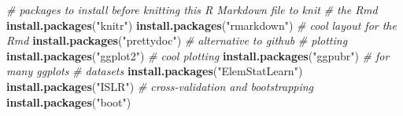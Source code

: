 \documentclass[]{article}
\newenvironment{Shaded}{\begin{snugshade}}{\end{snugshade}}
\newcommand{\KeywordTok}[1]{\textcolor[rgb]{0.13,0.29,0.53}{\textbf{#1}}}
\newcommand{\StringTok}[1]{\textcolor[rgb]{0.31,0.60,0.02}{#1}}
\newcommand{\CommentTok}[1]{\textcolor[rgb]{0.56,0.35,0.01}{\textit{#1}}}
\newcommand{\NormalTok}[1]{#1}
\begin{document}
\begin{Shaded}
\begin{Highlighting}[]
\CommentTok{# packages to install before knitting this R Markdown file to knit}
\CommentTok{# the Rmd}
\KeywordTok{install.packages}\NormalTok{(}\StringTok{"knitr"}\NormalTok{)}
\KeywordTok{install.packages}\NormalTok{(}\StringTok{"rmarkdown"}\NormalTok{)}
\CommentTok{# cool layout for the Rmd}
\KeywordTok{install.packages}\NormalTok{(}\StringTok{"prettydoc"}\NormalTok{)  }\CommentTok{# alternative to github}
\CommentTok{# plotting}
\KeywordTok{install.packages}\NormalTok{(}\StringTok{"ggplot2"}\NormalTok{)  }\CommentTok{# cool plotting}
\KeywordTok{install.packages}\NormalTok{(}\StringTok{"ggpubr"}\NormalTok{)  }\CommentTok{# for many ggplots}
\CommentTok{# datasets}
\KeywordTok{install.packages}\NormalTok{(}\StringTok{"ElemStatLearn"}\NormalTok{)}
\KeywordTok{install.packages}\NormalTok{(}\StringTok{"ISLR"}\NormalTok{)}
\CommentTok{# cross-validation and bootstrapping}
\KeywordTok{install.packages}\NormalTok{(}\StringTok{"boot"}\NormalTok{)}
\end{Highlighting}
\end{Shaded}
\end{document}
